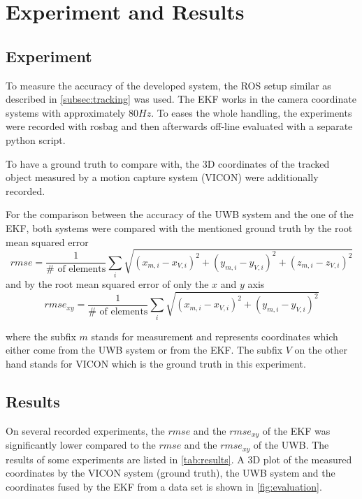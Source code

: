 \chapter{Experiment and Results}

\section{Experiment}
To measure the accuracy of the developed system, the \ac{ROS} setup similar as described in \autoref{subsec:tracking} was used. The \ac{EKF} works in the camera coordinate systems with approximately $80\mathit{Hz}$. To eases the whole handling, the experiments were recorded with rosbag and then afterwards off-line evaluated with a separate python script.

To have a ground truth to compare with, the 3D coordinates of the tracked object measured by a motion capture system (VICON) were additionally recorded.

For the comparison between the accuracy of the \ac{UWB} system and the one of the \ac{EKF}, both systems were compared with the mentioned ground truth by the root mean squared error $$\textit{rmse} = \frac{1}{\#\text{ of elements}} \sum_i \sqrt{(x_{m,i} - x_{V,i})^2 + (y_{m,i} - y_{V,i})^2 + (z_{m,i} - z_{V,i})^2}$$
and by the root mean squared error of only the $x$ and $y$ axis
$$\textit{rmse}_{xy} = \frac{1}{\#\text{ of elements}} \sum_i \sqrt{(x_{m,i} - x_{V,i})^2 + (y_{m,i} - y_{V,i})^2}$$

where the subfix $m$ stands for measurement and represents coordinates which either come from the \ac{UWB} system or from the \ac{EKF}. The subfix $V$ on the other hand stands for VICON which is the ground truth in this experiment. 

\section{Results}
On several recorded experiments, the $\textit{rmse}$ and the $\textit{rmse}_{xy}$ of the \ac{EKF} was significantly lower compared to the $\textit{rmse}$ and the $\textit{rmse}_{xy}$ of the \ac{UWB}. The results of some experiments are listed in \autoref{tab:results}. A 3D plot of the measured coordinates by the VICON system (ground truth), the \ac{UWB} system and the coordinates fused by the \ac{EKF} from a data set is shown in \autoref{fig:evaluation}.

